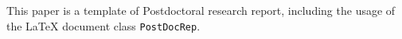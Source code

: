 
\begin{abstract}
本文是博士后研究报告的~\LaTeX{}~模板，同时简单介绍了~\LaTeX{}~文档类
~\texttt{PostDocRep}~的用法。

\end{abstract}


\begin{englishabstract}
This paper is a template of Postdoctoral research report, including
the usage of the \LaTeX{} document class \texttt{PostDocRep}.

\end{englishabstract}
